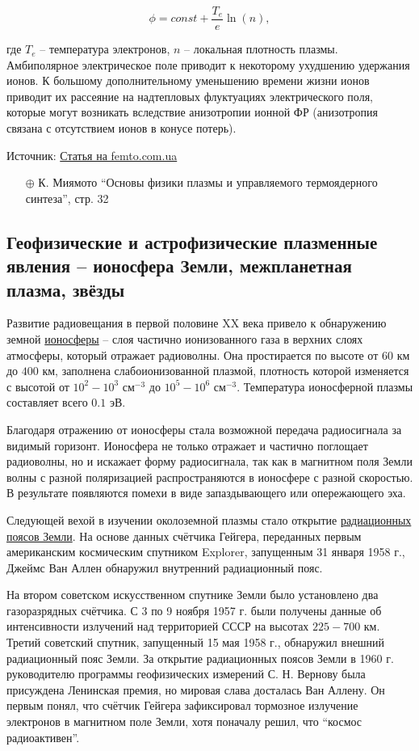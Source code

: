 \documentclass[10pt, a4paper]{article}
\begin{document}
\begin{equation*}
	\phi = const + \frac{T_e}{e}\ln(n),
\end{equation*}

где $T_e$ -- температура электронов, $n$ -- локальная плотность плазмы. Амбиполярное электрическое поле приводит к некоторому ухудшению удержания ионов. К большому дополнительному уменьшению времени жизни ионов приводит их рассеяние на надтепловых флуктуациях электрического поля, которые могут возникать вследствие анизотропии ионной ФР (анизотропия связана с отсутствием ионов в конусе потерь).

Источник: \href{http://femto.com.ua/articles/part_2/2692.html}{Статья на femto.com.ua}

\begin{itemize}
	\item[$\oplus$] К. Миямото ``Основы физики плазмы и управляемого термоядерного синтеза'', стр. 32
\end{itemize}

\subsection{Геофизические и астрофизические плазменные явления -- ионосфера Земли, межпланетная плазма, звёзды}

Развитие радиовещания в первой половине XX века привело к обнаружению земной \uline{ионосферы} -- слоя частично ионизованного газа в верхних слоях атмосферы, который отражает радиоволны. Она простирается по высоте от $60$ км до $400$ км, заполнена слабоионизованной плазмой, плотность которой изменяется с высотой от $10^2-10^3$ см$^{-3}$ до $10^5-10^6$ см$^{-3}$. Температура ионосферной плазмы составляет всего $0.1$ эВ.

Благодаря отражению от ионосферы стала возможной передача радиосигнала за видимый горизонт. Ионосфера не только отражает и частично поглощает радиоволны, но и искажает форму радиосигнала, так как в магнитном поля Земли волны с разной поляризацией распространяются в ионосфере с разной скоростью. В результате появляются помехи в виде запаздывающего или опережающего эха. 

Следующей вехой в изучении околоземной плазмы стало открытие \uline{радиационных поясов Земли}. На основе данных счётчика Гейгера, переданных первым американским космическим спутником Explorer, запущенным 31 января 1958 г., Джеймс Ван Аллен обнаружил внутренний радиационный пояс.

На втором советском искусственном спутнике Земли было установлено два газоразрядных счётчика. С 3 по 9 ноября 1957 г. были получены данные об интенсивности излучений над территорией СССР на высотах $225-700$ км. Третий советский спутник, запущенный 15 мая 1958 г., обнаружил внешний радиационный пояс Земли. За открытие радиационных поясов Земли в 1960 г. руководителю программы геофизических измерений С. Н. Вернову была присуждена Ленинская премия, но мировая слава досталась Ван Аллену. Он первым понял, что счётчик Гейгера зафиксировал тормозное излучение электронов в магнитном поле Земли, хотя поначалу решил, что ``космос радиоактивен''.
\end{document}
